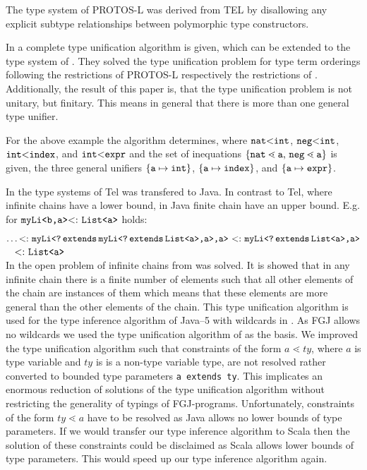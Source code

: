 The type system of \textsf{PROTOS-L} \cite{CB95} was
derived from \textsf{TEL} by disallowing any explicit subtype relationships
between polymorphic type constructors. 

In \cite{CB95}
a complete type unification algorithm is given, which can be extended to the
type system of \cite{HiTo92}. They solved the type unification problem for type
term orderings following the restrictions of \textsf{PROTOS-L} respectively the
restrictions of \cite{HiTo92}. Additionally, the result of this paper is, that
the type unification problem is not unitary, but finitary. This means in
general that there is more than one general type unifier. 

For the above example the algorithm determines, where $\texttt{nat} \mbox{$<$}
\texttt{int}$, $\texttt{neg} \mbox{$<$} \texttt{int}$, $\mathtt{int} \mbox{$<$}
\mathtt{index}$, and $\mathtt{int} \mbox{$<$} \mathtt{expr}$ and the set of
inequations $\set{\mathtt{nat} \lessdot
  \mathtt{a}$, $\mathtt{neg} \lessdot \mathtt{a}}$ is given, the three general
unifiers $\{ \mathtt{a} \mapsto \texttt{int} \}$, $\{ \mathtt{a} \mapsto
  \mathtt{index} \}$, and $\{ \mathtt{a} \mapsto \mathtt{expr} \}$. 

In \cite{plue09_1} the type systems of \textsf{Tel} was transfered to Java. In
contrast to \textsf{Tel}, where infinite chains have a lower bound, 
in Java finite chain have an upper bound. E.g. for $\texttt{myLi}\textrm{{\tt <b,a}}\textrm{{\tt >}} \textrm{$<:$}\  \texttt{List}\textrm{{\tt <a}}\textrm{{\tt >}}$ holds:

\smallskip
\noindent
$\ldots \textrm{$<:$}\ 
\texttt{myLi}\textrm{{\tt <\texttt{?\,extends\,myLi}\textrm{{\tt <\texttt{\textrm{{\tt ?}}\,extends\,List}\textrm{{\tt <a}}\textrm{{\tt >}},a}}\textrm{{\tt >}},a}}\textrm{{\tt >}}
\ \textrm{$<:$}\  \texttt{myLi}\textrm{{\tt <\texttt{?\,extends\,List}\textrm{{\tt <a}}\textrm{{\tt >}},a}}\textrm{{\tt >}}$\\
\mbox{ } \hfill $\textrm{$<:$}\ 
\texttt{List}\textrm{{\tt <a}}\textrm{{\tt >}}$\\

In \cite{plue09_1} the open problem of infinite chains from \cite{GS89} was solved.
It is showed that in any infinite chain there is a finite number of elements such that
all other elements of the chain are instances of them which means that these
elements are more general than the other elements of the chain. This type
unification algorithm is used for the type inference algorithm of Java--5 with
wildcards in \cite{Plue07_3}. As FGJ allows no wildcards we used
the type unification algorithm of \cite{Plue04_1}  as the basis.
We improved the type unification algorithm such that constraints
of the form $a \lessdot ty$, where $a$ is type variable and $ty$ is is a
non-type variable type,
are not resolved rather converted to bounded type parameters \texttt{a extends
  ty}. This implicates an enormous reduction of solutions of the type
unification algorithm without restricting the generality of typings of
FGJ-programs. Unfortunately, constraints of the form $ty \lessdot a$ have
to be resolved as Java allows no lower bounds of type parameters. If we would
transfer our type inference algorithm to Scala then the solution of these
constraints could be disclaimed as Scala allows lower bounds of type
parameters. This would speed up our type inference algorithm again.






